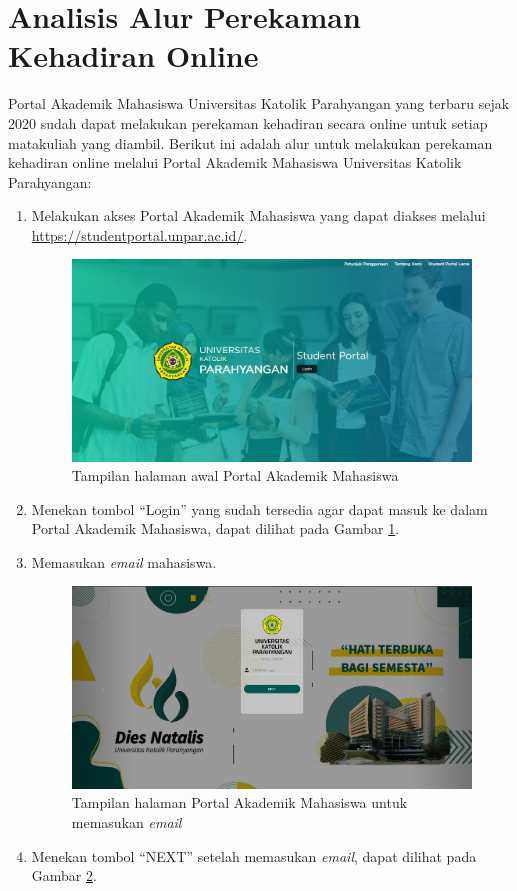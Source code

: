 \section{Analisis Alur Perekaman Kehadiran Online}
\label{sec:alur} 
Portal Akademik Mahasiswa Universitas Katolik Parahyangan yang terbaru sejak 2020 sudah dapat melakukan perekaman kehadiran secara online untuk setiap matakuliah yang diambil. Berikut ini adalah alur untuk melakukan perekaman kehadiran online melalui Portal Akademik Mahasiswa Universitas Katolik Parahyangan:
\begin{enumerate}
	\item Melakukan akses Portal Akademik Mahasiswa yang dapat diakses melalui \url{https://studentportal.unpar.ac.id/}.
	\begin{figure}[H]
		\centering
		\includegraphics[scale=0.225]{Gambar/halaman2019.jpg}
		\caption{Tampilan halaman awal Portal Akademik Mahasiswa} 
		\label{fig:studpor_home_2019}
	\end{figure}
	\item Menekan tombol ``Login'' yang sudah tersedia agar dapat masuk ke dalam Portal Akademik Mahasiswa, dapat dilihat pada Gambar \ref{fig:studpor_home_2019}.
	
	\item Memasukan \textit{email} mahasiswa.
	\begin{figure}[H]
		\centering
		\includegraphics[scale=0.225]{Gambar/login.jpg}
		\caption{Tampilan halaman Portal Akademik Mahasiswa untuk memasukan \textit{email}} 
		\label{fig:login}
	\end{figure}
	\item Menekan tombol ``NEXT'' setelah memasukan \textit{email}, dapat dilihat pada Gambar \ref{fig:login}.
	

\end{enumerate}
